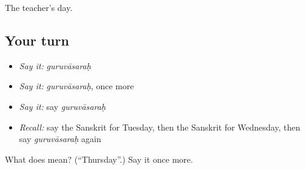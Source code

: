 \begin{grammarlens}[title={What you've built}]
The teacher's day.
\end{grammarlens}

\subsection*{Your turn}
\begin{itemize}
\raggedright
  \item \emph{Say it:} \emph{guruvāsaraḥ}
  \item \emph{Say it:} \emph{guruvāsaraḥ}, once more
  \item \emph{Say it:} say \emph{guruvāsaraḥ}
  \item \emph{Recall:} say the Sanskrit for Tuesday, then the Sanskrit for Wednesday, then say \emph{guruvāsaraḥ} again
\end{itemize}

\begin{tcolorbox}[breakable,colback=teal!4,colframe=teal!35!black,title={Before you move on}]
What does  mean? (\textquotedblleft{}Thursday\textquotedblright{}.) Say it once more.
\end{tcolorbox}
